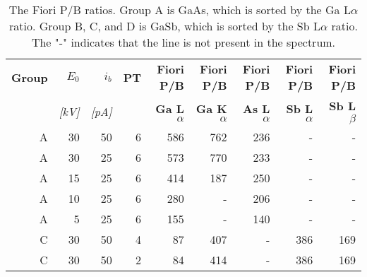 \begin{table}[hbtp]
    \begin{center}
        \caption{
            The Fiori P/B ratios.
            Group A is GaAs, which is sorted by the Ga L$\alpha$ ratio.
            Group B, C, and D is GaSb, which is sorted by the Sb L$\alpha$ ratio.
            The "-" indicates that the line is not present in the spectrum.
        }
        \label{tab:results:fiori}
        \begin{tabular}{rrrrrrrrr}
            \hline
            \textbf{Group} & \textbf{$E_0$} & \textbf{$i_b$} & \textbf{PT} & \textbf{Fiori P/B}    & \textbf{Fiori P/B}    & \textbf{Fiori P/B}    & \textbf{Fiori P/B}    & \textbf{Fiori P/B}   \\
            \emph{}        & \emph{[kV]}    & \emph{[pA]}    & \emph{}     & \textbf{Ga L$\alpha$} & \textbf{Ga K$\alpha$} & \textbf{As L$\alpha$} & \textbf{Sb L$\alpha$} & \textbf{Sb L$\beta$} \\
            \hline
            A              & 30             & 50             & 6           & 586                   & 762                   & 236                   & -                     & -                    \\
            A              & 30             & 25             & 6           & 573                   & 770                   & 233                   & -                     & -                    \\
            A              & 15             & 25             & 6           & 414                   & 187                   & 250                   & -                     & -                    \\
            A              & 10             & 25             & 6           & 280                   & -                     & 206                   & -                     & -                    \\
            A              & 5              & 25             & 6           & 155                   & -                     & 140                   & -                     & -                    \\
            \hline
            C              & 30             & 50             & 4           & 87                    & 407                   & -                     & 386                   & 169                  \\
            C              & 30             & 50             & 2           & 84                    & 414                   & -                     & 386                   & 169                  \\

\end{tabular}
\end{center}
\end{table}

